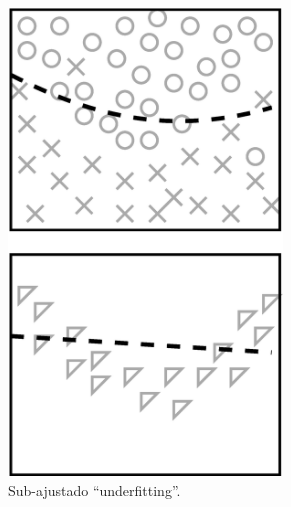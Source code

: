 \begin{figure}[!h]
  \centering
     \begin{subfigure}[b]{0.3\textwidth}
         \centering
         \includegraphics[width=0.8\textwidth]{chapters/cap-learning/fitting-under.eps} 
         \caption{Sub-ajustado ``underfitting''.}
         \label{fig:fitting:under}
     \end{subfigure}
     \quad
     \begin{subfigure}[b]{0.3\textwidth}
         \centering

\end{subfigure}
\end{figure}
